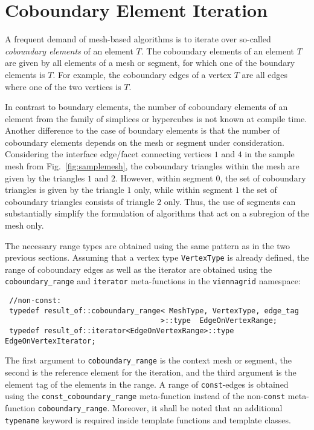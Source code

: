 \section{Coboundary Element Iteration}
A frequent demand of mesh-based algorithms is to iterate over so-called \emph{coboundary elements} of an element $T$.
The coboundary elements of an element $T$ are given by all elements of a mesh or segment, for which one of the boundary elements is $T$.
For example, the coboundary edges of a vertex $T$ are all edges where one of the two vertices is $T$.

In contrast to boundary elements, the number of coboundary elements of an element from the family of simplices or hypercubes is not known at compile time.
Another difference to the case of boundary elements is that the number of coboundary elements depends on the mesh or segment under consideration.
Considering the interface edge/facet connecting vertices $1$ and $4$ in the sample mesh from Fig.~\ref{fig:samplemesh}, the coboundary triangles within the mesh are given by the triangles $1$ and $2$.
However, within segment $0$, the set of coboundary triangles is given by the triangle $1$ only, while within segment $1$ the set of coboundary triangles consists of triangle $2$ only.
Thus, the use of segments can substantially simplify the formulation of algorithms that act on a subregion of the mesh only.

The necessary range types are obtained using the same pattern as in the two previous sections.
Assuming that a vertex type \lstinline|VertexType| is already defined, the range of coboundary edges as well as the iterator are obtained
using the \lstinline|coboundary_range| and \lstinline|iterator| meta-functions in the \lstinline|viennagrid| namespace:
\begin{lstlisting}
 //non-const:
 typedef result_of::coboundary_range< MeshType, VertexType, edge_tag
                                    >::type  EdgeOnVertexRange;
 typedef result_of::iterator<EdgeOnVertexRange>::type    EdgeOnVertexIterator;
\end{lstlisting}
The first argument to \lstinline|coboundary_range| is the context mesh or segment, the second is the reference element for the iteration, and the third argument is the element tag of the elements in the range.
A range of \lstinline|const|-edges is obtained using the \lstinline|const_coboundary_range| meta-function instead of the non-\lstinline|const| meta-function \lstinline|coboundary_range|.
Moreover, it shall be noted that an additional \lstinline|typename| keyword is required inside template functions and template classes.

